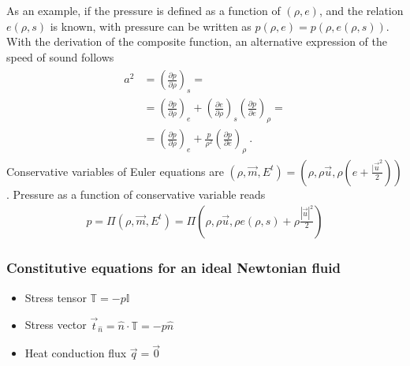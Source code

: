 \documentclass[letterpaper,10pt,english]{jupyterBook}
\begin{document}
\sphinxAtStartPar
As an example, if the pressure is defined as a function of \((\rho, e)\), and the relation \(e(\rho,s)\) is known, with pressure can be written as \(p(\rho, e) = p(\rho, e(\rho,s))\). With the derivation of the composite function, an alternative expression of the speed of sound follows
\begin{equation}\label{equation:ch/pde/hyperbolic-nd-euler:eq:pde:hyperbolic:euler:speed-of-sound:rho-e}
\begin{split}\begin{aligned}
  a^2
  & = \left( \frac{\partial p}{\partial \rho} \right)_s = \\
  & = \left( \frac{\partial p}{\partial \rho} \right)_e + \left( \frac{\partial e}{\partial \rho} \right)_s \left( \frac{\partial p}{\partial e} \right)_\rho = \\
  & = \left( \frac{\partial p}{\partial \rho} \right)_e + \frac{p}{\rho^2} \left( \frac{\partial p}{\partial e} \right)_\rho \ .
\end{aligned}\end{split}
\end{equation}
\sphinxAtStartPar
Conservative variables of Euler equations are \((\rho, \vec{m}, E^t) = \left( \rho, \rho \vec{u}, \rho \left( e + \frac{|\vec{u}^2}{2} \right) \right)\). Pressure as a function of conservative variable reads
\begin{equation*}
\begin{split}p = \Pi \left( \rho, \vec{m}, E^t \right) = \Pi \left( \rho, \rho \vec{u}, \rho e(\rho,s) + \rho \frac{|\vec{u}|^2}{2} \right)\end{split}
\end{equation*}\subsubsection*{Constitutive equations for an ideal Newtonian fluid}
\begin{itemize}
\item {} 
\sphinxAtStartPar
Stress tensor \(\mathbb{T} = - p \mathbb{I}\)

\item {} 
\sphinxAtStartPar
Stress vector \(\vec{t}_{\hat{n}} = \hat{n} \cdot \mathbb{T} = - p \hat{n}\)

\item {} 
\sphinxAtStartPar
Heat conduction flux \(\vec{q} = \vec{0}\)

\end{itemize}
\end{document}
